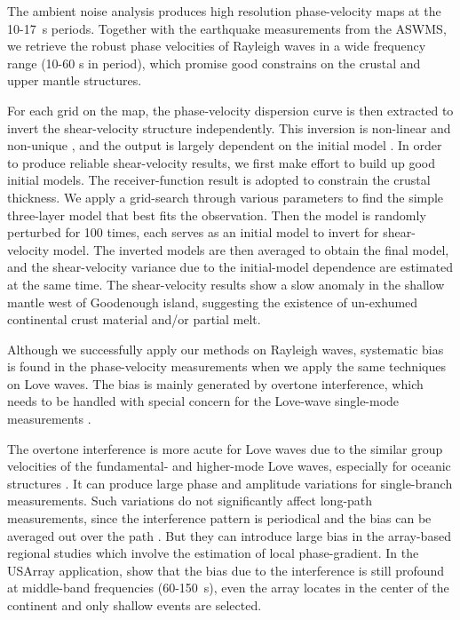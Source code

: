 \documentclass[12pt,oneside]{book}
\begin{document}
The ambient noise analysis produces high resolution phase-velocity maps at the 10-17~s periods. Together with the earthquake measurements from the ASWMS, we retrieve the robust phase velocities of Rayleigh waves in a wide frequency range (10-60 s in period), which promise good constrains on the crustal and upper mantle structures.

For each grid on the map, the phase-velocity dispersion curve is then extracted to invert the shear-velocity structure independently. This inversion is non-linear and non-unique \citep{Herrmann:2004wl}, and the output is largely dependent on the initial model \citep[e.g.][]{Foti:2009uo}. In order to produce reliable shear-velocity results, we first make effort to build up good initial models. 
The receiver-function result \citep{Abers:2012ul} is adopted to constrain the crustal thickness. We apply a grid-search through various parameters to find the simple three-layer model that best fits the observation. 
Then the model is randomly perturbed for 100 times, each serves as an initial model to invert for shear-velocity model. 
The inverted models are then averaged to obtain the final model, and the shear-velocity variance due to the initial-model dependence are estimated at the same time. 
The shear-velocity results show a slow anomaly in the shallow mantle west of Goodenough island, suggesting the existence of un-exhumed continental crust material and/or partial melt.

Although we successfully apply our methods on Rayleigh waves, systematic bias is found in the phase-velocity measurements when we apply the same techniques on Love waves. 
The bias is mainly generated by overtone interference, which needs to be handled with special concern for the Love-wave single-mode measurements \citep[e.g.][]{Thatcher:1969hg,Forsyth:1975tp,Gaherty:1996uf}.

The overtone interference is more acute for Love waves due to the similar group velocities of the fundamental- and higher-mode Love waves, especially for oceanic structures \citep{Nettles:2011bb}. It can produce large phase and amplitude variations for single-branch measurements.  
Such variations do not significantly affect long-path measurements, since the interference pattern is periodical and the bias can be averaged out over the path \citep{Nettles:2011bb}. But they can introduce large bias in the array-based regional studies which involve the estimation of local phase-gradient. In the USArray application, \citet{Foster:2014kr} show that the bias due to the interference is still profound at middle-band frequencies (60-150~s), even the array locates in the center of the continent and only shallow events are selected. 
\end{document}

